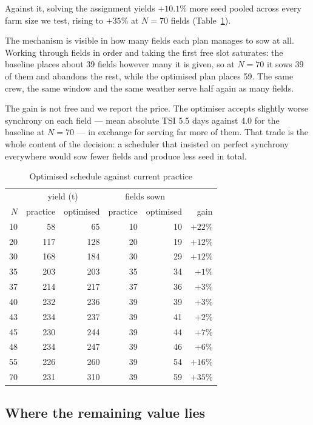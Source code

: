 \documentclass[10pt,twocolumn]{article}
\begin{document}
Against it, solving the assignment yields
$+10.1$\% more seed pooled across every farm size
we test, rising to $+35$\% at $N = 70$ fields (Table~\ref{tab:solution}).

The mechanism is visible in how many fields each plan manages to sow
at all. Working through fields in order and taking the first free
slot saturates: the baseline places about 39 fields however many it is given, so at
$N = 70$ it sows 39 of them and
abandons the rest, while the optimised plan places
59. The same crew, the same window and the
same weather serve half again as many fields.

The gain is not free and we report the price. The optimiser accepts
slightly worse synchrony on each field --- mean absolute TSI
5.5 days against
4.0 for the baseline at
$N = 70$ --- in exchange for serving far more of them.
That trade is the whole content of the decision: a scheduler that
insisted on perfect synchrony everywhere would sow fewer fields and
produce less seed in total.

\begin{table}[t]
\centering
\caption{Optimised schedule against current practice}
\label{tab:solution}
\begin{tabular}{rrrrrr}
\hline
 & \multicolumn{2}{c}{yield (t)} & \multicolumn{2}{c}{fields sown} & \\
$N$ & practice & optimised & practice & optimised & gain \\
\hline
10 & 58 & 65 & 10 & 10 & $+22$\% \\
20 & 117 & 128 & 20 & 19 & $+12$\% \\
30 & 168 & 184 & 30 & 29 & $+12$\% \\
35 & 203 & 203 & 35 & 34 & $+1$\% \\
37 & 214 & 217 & 37 & 36 & $+3$\% \\
40 & 232 & 236 & 39 & 39 & $+3$\% \\
43 & 234 & 237 & 39 & 41 & $+2$\% \\
45 & 230 & 244 & 39 & 44 & $+7$\% \\
48 & 234 & 247 & 39 & 46 & $+6$\% \\
55 & 226 & 260 & 39 & 54 & $+16$\% \\
70 & 231 & 310 & 39 & 59 & $+35$\% \\
\hline
\end{tabular}
\end{table}

\subsection{Where the remaining value lies}
\end{document}

